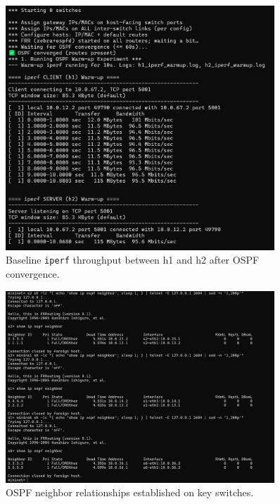 \documentclass[12pt]{article}
\begin{document}
\begin{figure}[h!]
    \centering
    \includegraphics[width=0.9\textwidth]{p4_iperf.jpeg}
    \caption{Baseline \texttt{iperf} throughput between h1 and h2 after OSPF convergence.}
    \label{fig:iperf_warmup}
\end{figure}

\begin{figure}[h!]
    \centering
    \includegraphics[width=0.9\textwidth]{p4_neighbor.jpeg}
    \caption{OSPF neighbor relationships established on key switches.}
    \label{fig:ospf_neighbors}
\end{figure}
\end{document}
